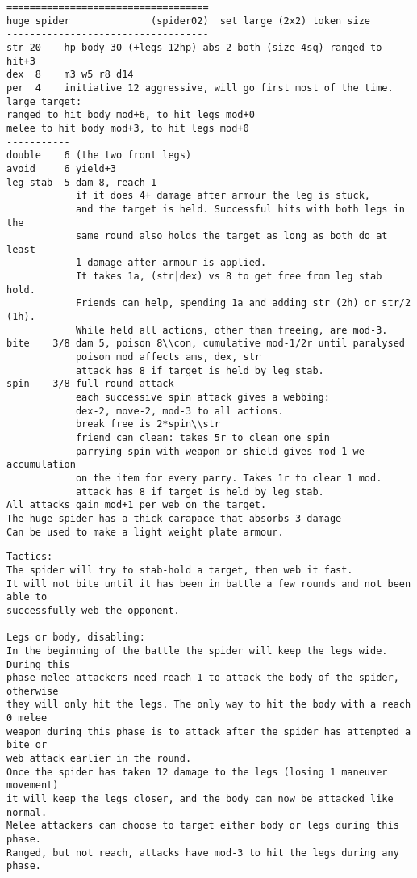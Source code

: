 \goodbreak \begin{samepage} \small \begin{verbatim}
===================================
huge spider              (spider02)  set large (2x2) token size
-----------------------------------
str 20    hp body 30 (+legs 12hp) abs 2 both (size 4sq) ranged to hit+3
dex  8    m3 w5 r8 d14
per  4    initiative 12 aggressive, will go first most of the time.
large target:
ranged to hit body mod+6, to hit legs mod+0
melee to hit body mod+3, to hit legs mod+0
-----------
double    6 (the two front legs)
avoid     6 yield+3
leg stab  5 dam 8, reach 1
            if it does 4+ damage after armour the leg is stuck,
            and the target is held. Successful hits with both legs in the
            same round also holds the target as long as both do at least
            1 damage after armour is applied.
            It takes 1a, (str|dex) vs 8 to get free from leg stab hold.
            Friends can help, spending 1a and adding str (2h) or str/2 (1h).
            While held all actions, other than freeing, are mod-3.
bite    3/8 dam 5, poison 8\\con, cumulative mod-1/2r until paralysed
            poison mod affects ams, dex, str
            attack has 8 if target is held by leg stab.
spin    3/8 full round attack
            each successive spin attack gives a webbing:
            dex-2, move-2, mod-3 to all actions.
            break free is 2*spin\\str
            friend can clean: takes 5r to clean one spin
            parrying spin with weapon or shield gives mod-1 we accumulation
            on the item for every parry. Takes 1r to clear 1 mod.
            attack has 8 if target is held by leg stab.
All attacks gain mod+1 per web on the target.
The huge spider has a thick carapace that absorbs 3 damage
Can be used to make a light weight plate armour.
\end{verbatim} \end{samepage} \goodbreak \begin{samepage} \begin{verbatim}
Tactics:
The spider will try to stab-hold a target, then web it fast.
It will not bite until it has been in battle a few rounds and not been able to
successfully web the opponent.

Legs or body, disabling:
In the beginning of the battle the spider will keep the legs wide. During this
phase melee attackers need reach 1 to attack the body of the spider, otherwise
they will only hit the legs. The only way to hit the body with a reach 0 melee
weapon during this phase is to attack after the spider has attempted a bite or
web attack earlier in the round.
Once the spider has taken 12 damage to the legs (losing 1 maneuver movement)
it will keep the legs closer, and the body can now be attacked like normal.
Melee attackers can choose to target either body or legs during this phase.
Ranged, but not reach, attacks have mod-3 to hit the legs during any phase.


\end{verbatim}
\end{samepage}
